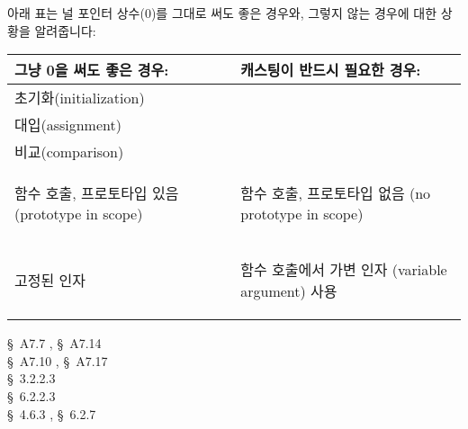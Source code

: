 \begin{faq}
	아래 표는 널 포인터 상수(0)를 그대로 써도 좋은 경우와, 그렇지 않는
	경우에 대한 상황을 알려줍니다:
\begin{center}
\begin{tabular}{p{4.2cm}|p{5cm}} \hline
	그냥 0을 써도 좋은 경우:	&
	캐스팅이 반드시 필요한 경우: \\ \hline
	초기화(initialization)	& \\
	대입(assignment)	& \\
	비교(comparison)	& \\
	\begin{flushleft}함수 호출, 
		프로토타입 있음 (prototype in scope) \end{flushleft} & 
		{ \begin{flushleft} 함수 호출, 프로토타입 없음  \linebreak
		(no prototype in scope) \end{flushleft} } \\
	\begin{flushleft}고정된 인자\end{flushleft}	& 
		\begin{flushleft}함수 호출에서 가변 인자 \linebreak 
		(variable argument) 사용 \end{flushleft} \\ \hline
\end{tabular}
\end{center}

\R	\cite{kr1} \S\ A7.7 , \S\ A7.14  \\
	\cite{kr2} \S\ A7.10 , \S\ A7.17  \\
	\cite{ansi} \S\ 3.2.2.3 \\
	\cite{c89} \S\ 6.2.2.3 \\
	\cite{hs} \S\ 4.6.3 , \S\ 6.2.7 
\end{faq}

